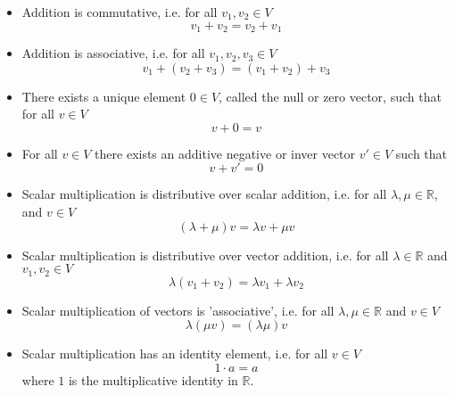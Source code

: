 \documentclass[12pt]{article}
\begin{document}
\begin{itemize}
    \item Addition is commutative, i.e. for all $v_{1}, v_{2} \in V$
    \begin{equation}
        v_{1} + v_{2} = v_{2} + v_{1}
    \end{equation}
    \item Addition is associative, i.e. for all $v_{1}, v_{2}, v_{3} \in V$
    \begin{equation}
        v_{1} + (v_{2} + v_{3}) = (v_{1} + v_{2}) + v_{3}
    \end{equation}
    \item There exists a unique element $0 \in V$, called the null or zero vector, such that for all $v\in V$
    \begin{equation}
        v + 0 = v
    \end{equation}
    \item For all $v\in V$ there exists an additive negative or inver vector $v'\in V$ such that
    \begin{equation}
        v + v' = 0 
    \end{equation}
    \item Scalar multiplication is distributive over scalar addition, i.e. for all $\lambda, \mu \in \mathbb{R}$, and $v\in V$
    \begin{equation}
        (\lambda + \mu)v = \lambda v + \mu v
    \end{equation}
    \item Scalar multiplication is distributive over vector addition, i.e. for all $\lambda\in\mathbb{R}$ and $v_{1}, v_{2}\in V$
    \begin{equation}
        \lambda(v_{1}+v_{2}) = \lambda v_{1} + \lambda v_{2}
    \end{equation}
    \item Scalar multiplication of vectors is 'associative', i.e. for all $\lambda, \mu \in \mathbb{R}$ and $v\in V$
    \begin{equation}
        \lambda(\mu v) = (\lambda\mu)v
    \end{equation}
    \item Scalar multiplication has an identity element, i.e. for all $v\in V$
    \begin{equation}
        1\cdot a = a
    \end{equation}
    where $1$ is the multiplicative identity in $\mathbb{R}$.
\end{itemize}
\end{document}
